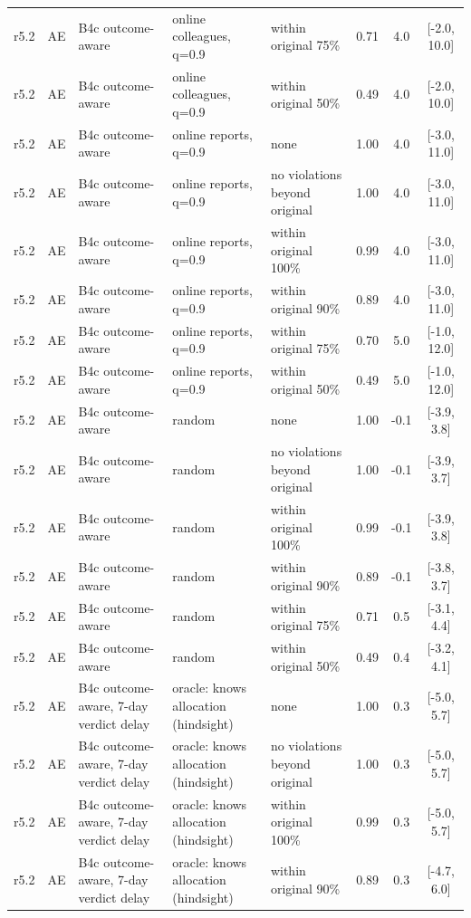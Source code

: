 \begin{longtable}{lllp{4.2cm}p{3.4cm}ccc}
r5.2 & AE & B4c outcome-aware & online colleagues, q=0.9 & within original 75\% & 0.71 & 4.0 & [-2.0, 10.0] \\
r5.2 & AE & B4c outcome-aware & online colleagues, q=0.9 & within original 50\% & 0.49 & 4.0 & [-2.0, 10.0] \\
r5.2 & AE & B4c outcome-aware & online reports, q=0.9 & none & 1.00 & 4.0 & [-3.0, 11.0] \\
r5.2 & AE & B4c outcome-aware & online reports, q=0.9 & no violations beyond original & 1.00 & 4.0 & [-3.0, 11.0] \\
r5.2 & AE & B4c outcome-aware & online reports, q=0.9 & within original 100\% & 0.99 & 4.0 & [-3.0, 11.0] \\
r5.2 & AE & B4c outcome-aware & online reports, q=0.9 & within original 90\% & 0.89 & 4.0 & [-3.0, 11.0] \\
r5.2 & AE & B4c outcome-aware & online reports, q=0.9 & within original 75\% & 0.70 & 5.0 & [-1.0, 12.0] \\
r5.2 & AE & B4c outcome-aware & online reports, q=0.9 & within original 50\% & 0.49 & 5.0 & [-1.0, 12.0] \\
r5.2 & AE & B4c outcome-aware & random & none & 1.00 & -0.1 & [-3.9, 3.8] \\
r5.2 & AE & B4c outcome-aware & random & no violations beyond original & 1.00 & -0.1 & [-3.9, 3.7] \\
r5.2 & AE & B4c outcome-aware & random & within original 100\% & 0.99 & -0.1 & [-3.9, 3.8] \\
r5.2 & AE & B4c outcome-aware & random & within original 90\% & 0.89 & -0.1 & [-3.8, 3.7] \\
r5.2 & AE & B4c outcome-aware & random & within original 75\% & 0.71 & 0.5 & [-3.1, 4.4] \\
r5.2 & AE & B4c outcome-aware & random & within original 50\% & 0.49 & 0.4 & [-3.2, 4.1] \\
r5.2 & AE & B4c outcome-aware, 7-day verdict delay & oracle: knows allocation (hindsight) & none & 1.00 & 0.3 & [-5.0, 5.7] \\
r5.2 & AE & B4c outcome-aware, 7-day verdict delay & oracle: knows allocation (hindsight) & no violations beyond original & 1.00 & 0.3 & [-5.0, 5.7] \\
r5.2 & AE & B4c outcome-aware, 7-day verdict delay & oracle: knows allocation (hindsight) & within original 100\% & 0.99 & 0.3 & [-5.0, 5.7] \\
r5.2 & AE & B4c outcome-aware, 7-day verdict delay & oracle: knows allocation (hindsight) & within original 90\% & 0.89 & 0.3 & [-4.7, 6.0] \\

\end{longtable}
